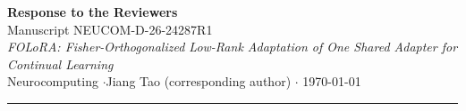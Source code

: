 \documentclass[11pt,a4paper]{article}
\begin{document}
\begin{center}
{\LARGE\bfseries Response to the Reviewers}\\[6pt]
{\large Manuscript NEUCOM-D-26-24287R1}\\[4pt]
{\large\itshape FOLoRA: Fisher-Orthogonalized Low-Rank Adaptation of One Shared Adapter for
Continual Learning}\\[6pt]
{\normalsize Neurocomputing \quad$\cdot$\quad Jiang Tao (corresponding author) \quad$\cdot$\quad
\today}
\end{center}

\vspace{4pt}
\hrule
\vspace{10pt}





\end{document}
